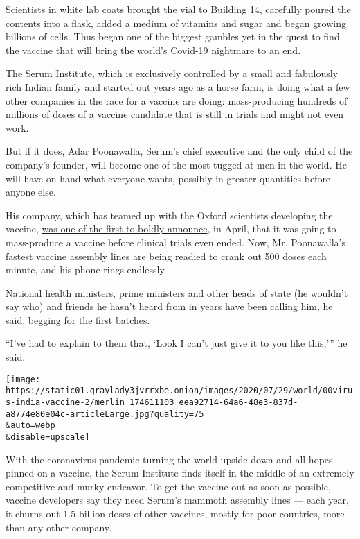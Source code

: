 Scientists in white lab coats brought the vial to Building 14, carefully
poured the contents into a flask, added a medium of vitamins and sugar
and began growing billions of cells. Thus began one of the biggest
gambles yet in the quest to find the vaccine that will bring the world's
Covid-19 nightmare to an end.

\href{https://www.seruminstitute.com/index.php}{The Serum Institute},
which is exclusively controlled by a small and fabulously rich Indian
family and started out years ago as a horse farm, is doing what a few
other companies in the race for a vaccine are doing: mass-producing
hundreds of millions of doses of a vaccine candidate that is still in
trials and might not even work.

But if it does, Adar Poonawalla, Serum's chief executive and the only
child of the company's founder, will become one of the most tugged-at
men in the world. He will have on hand what everyone wants, possibly in
greater quantities before anyone else.

His company, which has teamed up with the Oxford scientists developing
the vaccine,
\href{https://www.news18.com/news/business/indias-serum-institute-to-make-millions-of-potential-coronavirus-vaccine-doses-2597041.html}{was
one of the first to boldly announce}, in April, that it was going to
mass-produce a vaccine before clinical trials even ended. Now, Mr.
Poonawalla's fastest vaccine assembly lines are being readied to crank
out 500 doses each minute, and his phone rings endlessly.

National health ministers, prime ministers and other heads of state (he
wouldn't say who) and friends he hasn't heard from in years have been
calling him, he said, begging for the first batches.

``I've had to explain to them that, `Look I can't just give it to you
like this,''' he said.

\texttt{[image: https://static01.graylady3jvrrxbe.onion/images/2020/07/29/world/00virus-india-vaccine-2/merlin\_174611103\_eea92714-64a6-48e3-837d-a8774e80e04c-articleLarge.jpg?quality=75\\\&auto=webp\\\&disable=upscale]}

With the coronavirus pandemic turning the world upside down and all
hopes pinned on a vaccine, the Serum Institute finds itself in the
middle of an extremely competitive and murky endeavor. To get the
vaccine out as soon as possible, vaccine developers say they need
Serum's mammoth assembly lines --- each year, it churns out 1.5 billion
doses of other vaccines, mostly for poor countries, more than any other
company.

